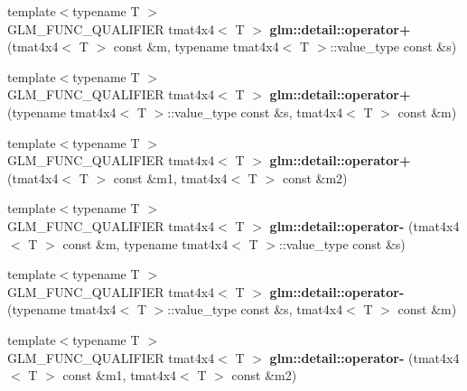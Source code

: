 \begin{DoxyCompactItemize}
\item 
\hypertarget{namespaceglm_1_1detail_a083841e8898763bb3eb998a12e7e17e7}{{\footnotesize template$<$typename T $>$ }\\G\-L\-M\-\_\-\-F\-U\-N\-C\-\_\-\-Q\-U\-A\-L\-I\-F\-I\-E\-R tmat4x4$<$ T $>$ {\bfseries glm\-::detail\-::operator+} (tmat4x4$<$ T $>$ const \&m, typename tmat4x4$<$ T $>$\-::value\-\_\-type const \&s)}\label{namespaceglm_1_1detail_a083841e8898763bb3eb998a12e7e17e7}

\item 
\hypertarget{namespaceglm_1_1detail_ab9eca823432fd7598fc78ad3b9420cf4}{{\footnotesize template$<$typename T $>$ }\\G\-L\-M\-\_\-\-F\-U\-N\-C\-\_\-\-Q\-U\-A\-L\-I\-F\-I\-E\-R tmat4x4$<$ T $>$ {\bfseries glm\-::detail\-::operator+} (typename tmat4x4$<$ T $>$\-::value\-\_\-type const \&s, tmat4x4$<$ T $>$ const \&m)}\label{namespaceglm_1_1detail_ab9eca823432fd7598fc78ad3b9420cf4}

\item 
\hypertarget{namespaceglm_1_1detail_ac9370bb87b47a02306b13b558092d0f5}{{\footnotesize template$<$typename T $>$ }\\G\-L\-M\-\_\-\-F\-U\-N\-C\-\_\-\-Q\-U\-A\-L\-I\-F\-I\-E\-R tmat4x4$<$ T $>$ {\bfseries glm\-::detail\-::operator+} (tmat4x4$<$ T $>$ const \&m1, tmat4x4$<$ T $>$ const \&m2)}\label{namespaceglm_1_1detail_ac9370bb87b47a02306b13b558092d0f5}

\item 
\hypertarget{namespaceglm_1_1detail_ac4a53ae4ed2d7973eab134462242e5ee}{{\footnotesize template$<$typename T $>$ }\\G\-L\-M\-\_\-\-F\-U\-N\-C\-\_\-\-Q\-U\-A\-L\-I\-F\-I\-E\-R tmat4x4$<$ T $>$ {\bfseries glm\-::detail\-::operator-\/} (tmat4x4$<$ T $>$ const \&m, typename tmat4x4$<$ T $>$\-::value\-\_\-type const \&s)}\label{namespaceglm_1_1detail_ac4a53ae4ed2d7973eab134462242e5ee}

\item 
\hypertarget{namespaceglm_1_1detail_ab8c37ba8caa7eacee94c69505f3d3670}{{\footnotesize template$<$typename T $>$ }\\G\-L\-M\-\_\-\-F\-U\-N\-C\-\_\-\-Q\-U\-A\-L\-I\-F\-I\-E\-R tmat4x4$<$ T $>$ {\bfseries glm\-::detail\-::operator-\/} (typename tmat4x4$<$ T $>$\-::value\-\_\-type const \&s, tmat4x4$<$ T $>$ const \&m)}\label{namespaceglm_1_1detail_ab8c37ba8caa7eacee94c69505f3d3670}

\item 
\hypertarget{namespaceglm_1_1detail_a39935cfee0b8b63f8c1716058e8faedb}{{\footnotesize template$<$typename T $>$ }\\G\-L\-M\-\_\-\-F\-U\-N\-C\-\_\-\-Q\-U\-A\-L\-I\-F\-I\-E\-R tmat4x4$<$ T $>$ {\bfseries glm\-::detail\-::operator-\/} (tmat4x4$<$ T $>$ const \&m1, tmat4x4$<$ T $>$ const \&m2)}\label{namespaceglm_1_1detail_a39935cfee0b8b63f8c1716058e8faedb}


\end{DoxyCompactItemize}
